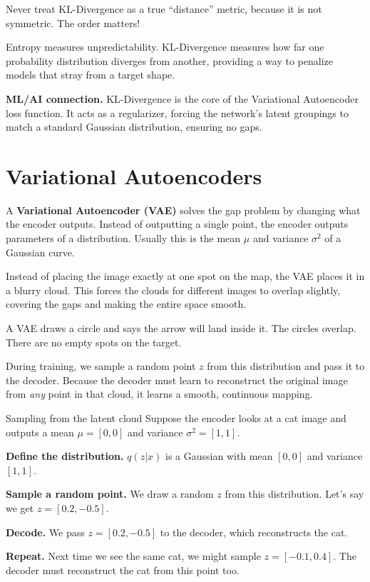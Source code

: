 \documentclass[a4paper,11pt]{article}
\newcommand{\vocab}[1]{\textbf{\color{navy}#1}}
\begin{document}
\begin{watchout}
Never treat KL-Divergence as a true ``distance'' metric, because it is not symmetric. The order matters!
\end{watchout}

\begin{keytake}
Entropy measures unpredictability. KL-Divergence measures how far one probability distribution diverges from another, providing a way to penalize models that stray from a target shape.
\end{keytake}

\noindent\textbf{ML/AI connection.}
KL-Divergence is the core of the Variational Autoencoder loss function. It acts as a regularizer, forcing the network's latent groupings to match a standard Gaussian distribution, ensuring no gaps.

\section{Variational Autoencoders}
A \vocab{Variational Autoencoder (VAE)} solves the gap problem by changing what the encoder outputs. Instead of outputting a single point, the encoder outputs parameters of a distribution. Usually this is the mean $\mu$ and variance $\sigma^2$ of a Gaussian curve.

\begin{intuition}
Instead of placing the image exactly at one spot on the map, the VAE places it in a blurry cloud. This forces the clouds for different images to overlap slightly, covering the gaps and making the entire space smooth.
\end{intuition}

\begin{everyday}
A VAE draws a circle and says the arrow will land inside it. The circles overlap. There are no empty spots on the target.
\end{everyday}

During training, we sample a random point $z$ from this distribution and pass it to the decoder. Because the decoder must learn to reconstruct the original image from \emph{any} point in that cloud, it learns a smooth, continuous mapping.

\begin{worked}{Sampling from the latent cloud}
Suppose the encoder looks at a cat image and outputs a mean $\mu = [0, 0]$ and variance $\sigma^2 = [1, 1]$.
\begin{steps}
  \item \textbf{Define the distribution.} $q(z|x)$ is a Gaussian with mean $[0, 0]$ and variance $[1, 1]$.
  \item \textbf{Sample a random point.} We draw a random $z$ from this distribution. Let's say we get $z = [0.2, -0.5]$.
  \item \textbf{Decode.} We pass $z = [0.2, -0.5]$ to the decoder, which reconstructs the cat.
  \item \textbf{Repeat.} Next time we see the same cat, we might sample $z = [-0.1, 0.4]$. The decoder must reconstruct the cat from this point too.
\end{steps}
\end{worked}
\end{document}
